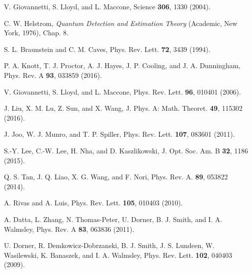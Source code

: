 \documentclass[aps,pra,reprint,showpacs,groupedaddress]{revtex4-1}
\begin{document}
\begin{thebibliography}{}

V. Giovannetti, S. Lloyd, and L. Maccone,
Science \textbf{306}, 1330 (2004).




C. W. Helstrom,
\textit{Quantum Detection and Estimation Theory}
(Academic, New York, 1976), Chap. 8.

S. L. Braunstein and C. M. Caves,
Phys. Rev. Lett. \textbf{72}, 3439 (1994).



P. A. Knott, T. J. Proctor, A. J. Hayes, J. P. Cooling, and J. A. Dunningham,
Phys. Rev. A \textbf{93}, 033859 (2016).





V. Giovannetti, S. Lloyd, and L. Maccone,
Phys. Rev. Lett. \textbf{96}, 010401 (2006).




J. Liu, X. M. Lu, Z. Sun, and X. Wang,
J. Phys. A: Math. Theoret. \textbf{49}, 115302 (2016).



J. Joo, W. J. Munro, and T. P. Spiller,
Phys. Rev. Lett. \textbf{107}, 083601 (2011).



S.-Y. Lee, C.-W. Lee, H. Nha, and D. Kaszlikowski,
J. Opt. Soc. Am. B \textbf{32}, 1186 (2015).




Q. S. Tan, J. Q. Liao, X. G. Wang, and F. Nori,
Phys. Rev. A. \textbf{89}, 053822 (2014).


A. Rivas and A. Luis,
Phys. Rev. Lett. \textbf{105}, 010403 (2010).


A. Datta, L. Zhang, N. Thomas-Peter, U. Dorner, B. J. Smith, and I. A. Walmsley,
Phys. Rev. A \textbf{83}, 063836 (2011).


U. Dorner, R. Demkowicz-Dobrzanski, B. J. Smith, J. S. Lundeen, W. Wasilewski, K. Banaszek, and I. A. Walmsley,
Phys. Rev. Lett. \textbf{102}, 040403 (2009).



\end{thebibliography}
\end{document}
